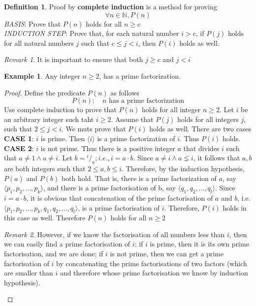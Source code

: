 \documentclass[11pt]{article}
\theoremstyle{plain}%
\theoremstyle{definition}
\newtheorem{defn}{Definition}
\newtheorem{exmp}{Example}[defn]
\theoremstyle{remark}
\newtheorem*{rem}{Remark}
\newcommand*\rfrac[2]{{}^{#1}\!/_{#2}}
\begin{document}
\begin{defn}
  \label{complete induction}
  Proof by \textbf{complete induction} is a method for proving \\
  \[
    \forall n\in \mathbb{N}, P(n)
  \]
  \textit{BASIS}: Prove that $P(n)$ holds for all $n \geq c$ \\
  \textit{INDUCTION STEP}: Prove that, for each natural number $i>c$, if $P(j)$ holds for all natural numbers $j$ such that $c\leq j < i$, then $P(i)$ holds as well.
  \begin{rem}
    It is important to ensure that both $j \geq c$ and $j< i$
  \end{rem}

  \begin{exmp}
    Any integer $n\geq 2$, has a prime factorization.

    \begin{proof}
      Define the predicate $P(n)$ as follows
      \[
        P(n):\quad n \text{ has a prime factorization}
      \]
      Use complete induction to prove that $P(n)$ holds for all integer $n\geq 2$. Let $i$ be an arbitrary integer such taht $i\geq 2$. Assume that $P(j)$ holds for all integers $j$, such that $2\leq j < i$. We muts prove that $P(i)$ holds as well. There are two cases \\
      \textbf{CASE 1}: $i$ is prime. Then $\langle i\rangle$ is a prime factorization of $i$. Thus $P(i)$ holds. \\
      \textbf{CASE 2}: $i$ is not prime. Thus there is a positive integer $a$ that divides $i$ such that $a\neq 1 \land a\neq i$. Let $b=\rfrac{i}{a}; i.e., i = a\cdot b$. Since $a\neq i \land a\lneq i$, it follows that $a,b$ are both integers such that $2\leq a,b \leq i$. Therefore, by the induction hypothesis, $P(a)$ and $P(b)$ both hold. That is, there is a prime factorization of $a$, say $\langle p_1, p_2, \dots, p_{k}\rangle$, and there is a prime factorisation of b, say $\langle q_1, q_2, \dots, q_l\rangle$. Since $i=a\cdot b$, it is obvious that concatenation of the prime factorisation of $a$ and $b$, i.e. $\langle p_1, p_2, \dots, p_k, q_1, q_2, \dots, q_l\rangle$, is a prime factorisation of $i$. Therefore, $P(i)$ holds in this case as well.
      Therefore $P(n)$ holds for all $n\geq 2$

      \begin{rem}
        However, if we know the factorisation of all numbers less than $i$, then we can easily find a prime factorisation of $i$: if $i$ is prime, then it is its own prime factorisation, and we are done; if $i$ is not prime, then we can get a prime factorisation of $i$ by concatenating the prime factorisations of two factors (which are smaller than $i$ and therefore whose prime factorisation we know by induction hypothesis).
      \end{rem}


\end{proof}
\end{exmp}
\end{defn}
\end{document}
